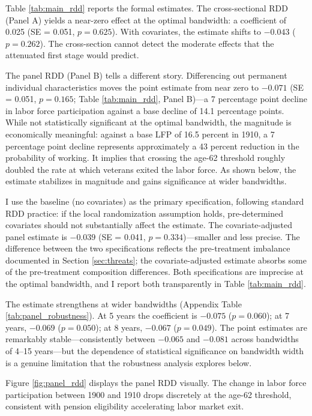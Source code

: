 \documentclass[12pt]{article}
\begin{document}
Table \ref{tab:main_rdd} reports the formal estimates. The cross-sectional RDD (Panel A) yields a near-zero effect at the optimal bandwidth: a coefficient of 0.025 (SE = 0.051, $p = 0.625$). With covariates, the estimate shifts to $-0.043$ ($p = 0.262$). The cross-section cannot detect the moderate effects that the attenuated first stage would predict.



The panel RDD (Panel B) tells a different story. Differencing out permanent individual characteristics moves the point estimate from near zero to $-0.071$ (SE = 0.051, $p = 0.165$; Table \ref{tab:main_rdd}, Panel B)---a 7 percentage point decline in labor force participation against a base decline of 14.1 percentage points. While not statistically significant at the optimal bandwidth, the magnitude is economically meaningful: against a base LFP of 16.5 percent in 1910, a 7 percentage point decline represents approximately a 43 percent reduction in the probability of working. It implies that crossing the age-62 threshold roughly doubled the rate at which veterans exited the labor force. As shown below, the estimate stabilizes in magnitude and gains significance at wider bandwidths.

I use the baseline (no covariates) as the primary specification, following standard RDD practice: if the local randomization assumption holds, pre-determined covariates should not substantially affect the estimate. The covariate-adjusted panel estimate is $-0.039$ (SE = 0.041, $p = 0.334$)---smaller and less precise. The difference between the two specifications reflects the pre-treatment imbalance documented in Section \ref{sec:threats}; the covariate-adjusted estimate absorbs some of the pre-treatment composition differences. Both specifications are imprecise at the optimal bandwidth, and I report both transparently in Table \ref{tab:main_rdd}.

The estimate strengthens at wider bandwidths (Appendix Table \ref{tab:panel_robustness}). At 5 years the coefficient is $-0.075$ ($p = 0.060$); at 7 years, $-0.069$ ($p = 0.050$); at 8 years, $-0.067$ ($p = 0.049$). The point estimates are remarkably stable---consistently between $-0.065$ and $-0.081$ across bandwidths of 4--15 years---but the dependence of statistical significance on bandwidth width is a genuine limitation that the robustness analysis explores below.

Figure \ref{fig:panel_rdd} displays the panel RDD visually. The change in labor force participation between 1900 and 1910 drops discretely at the age-62 threshold, consistent with pension eligibility accelerating labor market exit.
\end{document}
